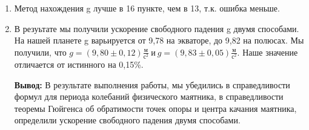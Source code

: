 \documentclass[a4paper,12pt]{article} %
\begin{document}
\begin{enumerate}
\item Метод нахождения g лучше в 16 пункте, чем в 13, т.к. ошибка меньше.

\item В резуьтате мы получили ускорение свободного падения g двумя способами. На нашей планете g варьируется от 9,78 на экваторе, до 9,82 на полюсах. Мы получили, что $ g = (9,80 \pm 0,12) \frac{\text{м}}{\text{с}^2}\ и\ g = (9,83 \pm 0,05) \frac{\text{м}}{\text{с}^2}$. Наше значение отличается от истинного на 0,15\%.

\textbf{Вывод:} \newline
В результате выполнения работы, мы убедились в справедливости формул для периода колебаний физического маятника, в справедливости теоремы Гюйгенса об обратимости точек опоры и центра качания маятника, определили ускорение свободного падения двумя способами.

\end{enumerate}
\end{document}
